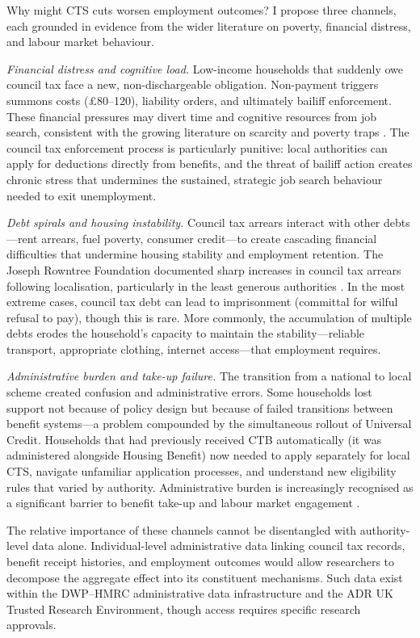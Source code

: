 \documentclass[12pt]{article}
\begin{document}
Why might CTS cuts worsen employment outcomes? I propose three channels, each grounded in evidence from the wider literature on poverty, financial distress, and labour market behaviour.

\emph{Financial distress and cognitive load.} Low-income households that suddenly owe council tax face a new, non-dischargeable obligation. Non-payment triggers summons costs (\pounds 80--120), liability orders, and ultimately bailiff enforcement. These financial pressures may divert time and cognitive resources from job search, consistent with the growing literature on scarcity and poverty traps \citep{chetty2013using}. The council tax enforcement process is particularly punitive: local authorities can apply for deductions directly from benefits, and the threat of bailiff action creates chronic stress that undermines the sustained, strategic job search behaviour needed to exit unemployment.

\emph{Debt spirals and housing instability.} Council tax arrears interact with other debts---rent arrears, fuel poverty, consumer credit---to create cascading financial difficulties that undermine housing stability and employment retention. The Joseph Rowntree Foundation documented sharp increases in council tax arrears following localisation, particularly in the least generous authorities \citep{jrf2015council}. In the most extreme cases, council tax debt can lead to imprisonment (committal for wilful refusal to pay), though this is rare. More commonly, the accumulation of multiple debts erodes the household's capacity to maintain the stability---reliable transport, appropriate clothing, internet access---that employment requires.

\emph{Administrative burden and take-up failure.} The transition from a national to local scheme created confusion and administrative errors. Some households lost support not because of policy design but because of failed transitions between benefit systems---a problem compounded by the simultaneous rollout of Universal Credit. Households that had previously received CTB automatically (it was administered alongside Housing Benefit) now needed to apply separately for local CTS, navigate unfamiliar application processes, and understand new eligibility rules that varied by authority. Administrative burden is increasingly recognised as a significant barrier to benefit take-up and labour market engagement \citep{chetty2013using}.

The relative importance of these channels cannot be disentangled with authority-level data alone. Individual-level administrative data linking council tax records, benefit receipt histories, and employment outcomes would allow researchers to decompose the aggregate effect into its constituent mechanisms. Such data exist within the DWP--HMRC administrative data infrastructure and the ADR UK Trusted Research Environment, though access requires specific research approvals.
\end{document}
